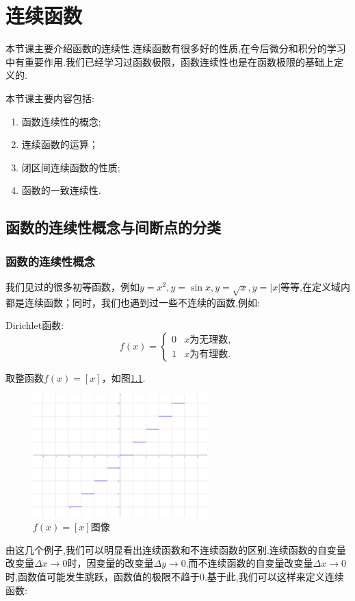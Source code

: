 \chapter{连续函数}

本节课主要介绍函数的连续性.连续函数有很多好的性质,在今后微分和积分的学习中有重要作用.我们已经学习过函数极限，函数连续性也是在函数极限的基础上定义的.

本节课主要内容包括:
\begin{enumerate}
	\item 函数连续性的概念;
	\item 连续函数的运算；
	\item 闭区间连续函数的性质;
	\item 函数的一致连续性.
\end{enumerate}

\section{函数的连续性概念与间断点的分类}
\subsection{函数的连续性概念}
我们见过的很多初等函数，例如$y=x^2,y=\sin x,y=\sqrt{x},y=\left|x\right|$等等,在定义域内都是连续函数；同时，我们也遇到过一些不连续的函数,例如:

Dirichlet函数:
\[
	f(x) =
	\begin{cases}
		0 & x \text{为无理数} , \\
		1 & x \text{为有理数} .
	\end{cases}
\]

取整函数$f(x)=[x]$，如图\ref{roundfun}.
\begin{figure}[H]
	\centering
	\includegraphics[width=0.6\textwidth]{figures/roundfun}
	\caption{$f(x)=[x]$图像}\label{roundfun}
\end{figure}

由这几个例子,我们可以明显看出连续函数和不连续函数的区别.连续函数的自变量改变量$\Delta x\to 0$时，因变量的改变量$\Delta y\to 0$.而不连续函数的自变量改变量$\Delta x\to 0$时,函数值可能发生跳跃，函数值的极限不趋于0.基于此,我们可以这样来定义连续函数:

